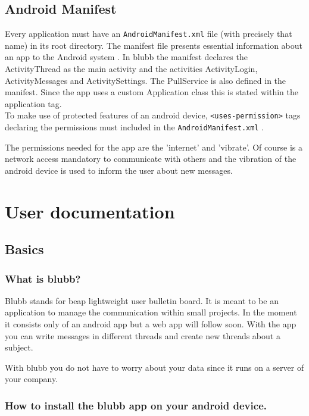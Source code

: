 \documentclass[12pt,a4paper,oneside]{report}
\newcommand{\appname}{blubb}
\newcommand{\beap}{beap}
\newcommand{\code}[1]{\lstinline{#1}}
\begin{document}
\section{Android Manifest}
Every application must have an \code{AndroidManifest.xml} file (with precisely that name) in its root directory. The manifest file presents essential information about an app to the Android system \citep{aDefManifest}.
In \appname{} the manifest declares the ActivityThread as the main activity and the activities ActivityLogin, ActivityMessages and ActivitySettings. The PullService is also defined in the manifest. Since the app uses a custom Application class this is stated within the application tag.\\

To make use of protected features of an android device, \code{<uses-permission>} tags declaring the permissions must included in the \code{AndroidManifest.xml} \citep{aDefPermissions}.

The permissions needed for the app are the 'internet' and 'vibrate'. Of course is a network access mandatory to communicate with others and the vibration of the android device is used to inform the user about new messages. 

\chapter{User documentation}

\section{Basics}
\subsection{What is blubb?}
Blubb stands for \beap{} lightweight user bulletin board. It is meant to be an application to manage the communication within small projects. In the moment it consists only of an android app but a web app will follow soon. With the app you can write messages in different threads and create new threads about a subject. 

With \appname{} you do not have to worry about your data since it runs on a server of your company. 

\subsection{How to install the \appname{} app on your android device.}
\end{document}

